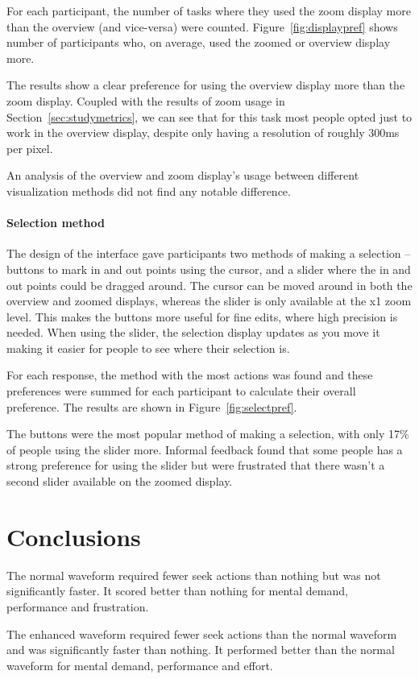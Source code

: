 For each participant, the number of tasks where they used the zoom display more than the overview (and vice-versa) were
counted. Figure~\ref{fig:displaypref} shows number of participants who, on average, used the zoomed or overview display
more.

The results show a clear preference for using the overview display more than the zoom display. Coupled with the results
of zoom usage in Section~\ref{sec:studymetrics}, we can see that for this task most people opted just to work in the
overview display, despite only having a resolution of roughly 300ms per pixel.

An analysis of the overview and zoom display's usage between different visualization methods did not find any notable
difference.

\paragraph{Selection method}
The design of the interface gave participants two methods of making a selection -- buttons to mark in and out points
using the cursor, and a slider where the in and out points could be dragged around. The cursor can be moved around in
both the overview and zoomed displays, whereas the slider is only available at the x1 zoom level. This makes the
buttons more useful for fine edits, where high precision is needed. When using the slider, the selection display
updates as you move it making it easier for people to see where their selection is.

For each response, the method with the most actions was found and these preferences were summed for each participant to
calculate their overall preference. The results are shown in Figure~\ref{fig:selectpref}.

The buttons were the most popular method of making a selection, with only 17\% of people using the slider more.
Informal feedback found that some people has a strong preference for using the slider but were frustrated that there
wasn't a second slider available on the zoomed display.

\section{Conclusions}\label{sec:colourised-conclusions}

The normal waveform required fewer seek actions than nothing but was not significantly faster. It scored better than nothing for mental demand, performance and frustration.

The enhanced waveform required fewer seek actions than the normal waveform and was significantly faster than nothing. It performed better than the normal waveform for mental demand, performance and effort.
